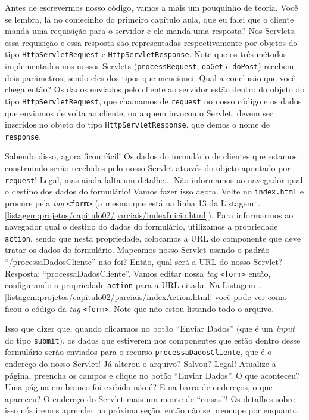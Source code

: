 Antes de escrevermos nosso código, vamos a mais um pouquinho de teoria. Você se lembra, lá no comecinho do primeiro capítulo aula, que eu falei que o cliente manda uma requisição para o servidor e ele manda uma resposta? Nos Servlets, essa requisição e essa resposta são representadas respectivamente por objetos do tipo \texttt{HttpServletRequest} e \texttt{HttpServletResponse}. Note que os três métodos implementados nos nossos Servlets (\texttt{processRequest}, \texttt{doGet} e \texttt{doPost}) recebem dois parâmetros, sendo eles dos tipos que mencionei. Qual a conclusão que você chega então? Os dados enviados pelo cliente ao servidor estão dentro do objeto do tipo \texttt{HttpServletRequest}, que chamamos de \texttt{request} no nosso código e os dados que enviamos de volta ao cliente, ou a quem invocou o Servlet, devem ser inseridos no objeto do tipo \texttt{HttpServletResponse}, que demos o nome de \texttt{response}.

Sabendo disso, agora ficou fácil! Os dados do formulário de clientes que estamos construindo serão recebidos pelo nosso Servlet através do objeto apontado por \texttt{request}! Legal, mas ainda falta um detalhe... Não informamos ao navegador qual o destino dos dados do formulário! Vamos fazer isso agora. Volte no \texttt{index.html} e procure pela \textit{tag} \texttt{<form>} (a mesma que está na linha 13 da Listagem~\thechapter.\ref{listagem:projetos/capitulo02/parciais/indexInicio.html}). Para informarmos ao navegador qual o destino do dados do formulário, utilizamos a propriedade \texttt{action}, sendo que nesta propriedade, colocamos a URL do componente que deve tratar os dados do formulário. Mapeamos nosso Servlet usando o padrão ``/processaDadosCliente'' não foi? Então, qual será a URL do nosso Servlet? Resposta: ``processaDadosCliente''. Vamos editar nossa \textit{tag} \texttt{<form>} então, configurando a propriedade \texttt{action} para a URL citada. Na Listagem~\thechapter.\ref{listagem:projetos/capitulo02/parciais/indexAction.html} você pode ver como ficou o código da \textit{tag} \texttt{<form>}. Note que não estou listando todo o arquivo.


Isso que dizer que, quando clicarmos no botão ``Enviar Dados'' (que é um \textit{input} do tipo \texttt{submit}), os dados que estiverem nos componentes que estão dentro desse formulário serão enviados para o recurso \texttt{processaDadosCliente}, que é o endereço do nosso Servlet! Já alterou o arquivo? Salvou? Legal! Atualize a página, preencha os campos e clique no botão ``Enviar Dados''. O que aconteceu? Uma página em branco foi exibida não é? E na barra de endereços, o que apareceu? O endereço do Servlet mais um monte de ``coisas''! Os detalhes sobre isso nós iremos aprender na próxima seção, então não se preocupe por enquanto.

